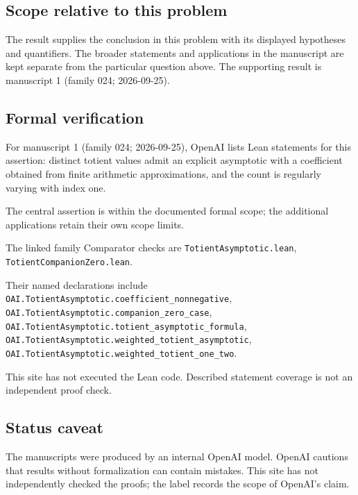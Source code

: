 \documentclass[11pt]{article}
\begin{document}
\subsection{Scope relative to this problem}
The result supplies the conclusion in this problem with its displayed hypotheses and quantifiers. The broader statements and applications in the manuscript are kept separate from the particular question above. The supporting result is manuscript 1 (family 024; 2026-09-25).

\subsection{Formal verification}
For manuscript 1 (family 024; 2026-09-25), OpenAI lists Lean statements for this assertion: distinct totient values admit an explicit asymptotic with a coefficient obtained from finite arithmetic approximations, and the count is regularly varying with index one.

The central assertion is within the documented formal scope; the additional applications retain their own scope limits.

The linked family Comparator checks are \texttt{TotientAsymptotic.lean}, \texttt{TotientCompanionZero.lean}.

Their named declarations include \texttt{OAI.TotientAsymptotic.coefficient\_nonnegative}, \texttt{OAI.TotientAsymptotic.companion\_zero\_case}, \texttt{OAI.TotientAsymptotic.totient\_asymptotic\_formula}, \texttt{OAI.TotientAsymptotic.weighted\_totient\_asymptotic}, \texttt{OAI.TotientAsymptotic.weighted\_totient\_one\_two}.

This site has not executed the Lean code. Described statement coverage is not an independent proof check.

\subsection{Status caveat}
The manuscripts were produced by an internal OpenAI model. OpenAI cautions that results without formalization can contain mistakes. This site has not independently checked the proofs; the label records the scope of OpenAI's claim.
\end{document}
